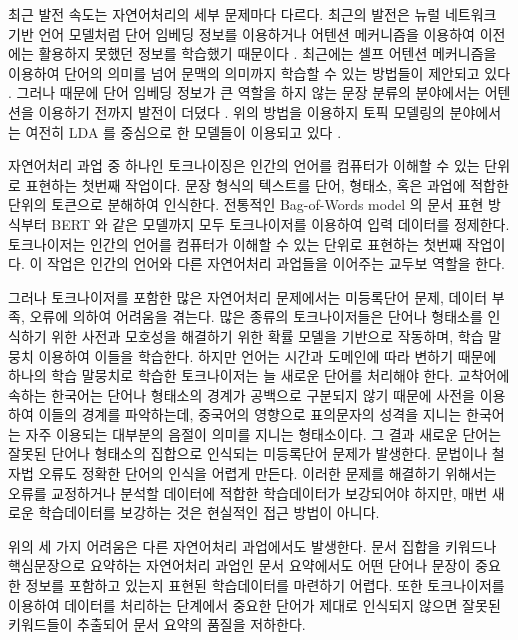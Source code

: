 \documentclass[oneside, ko,phd]{snuthesis_utf8_kor}
\begin{document}
최근 발전 속도는 자연어처리의 세부 문제마다 다르다.
최근의 발전은 뉴럴 네트워크 기반 언어 모델처럼 단어 임베딩 정보를 이용하거나 어텐션 메커니즘을 이용하여 이전에는 활용하지 못했던 정보를 학습했기 때문이다 \cite{joulin2016bag, bahdanau2014neural, lin2017structured}.
최근에는 셀프 어텐션 메커니즘을 이용하여 단어의 의미를 넘어 문맥의 의미까지 학습할 수 있는 방법들이 제안되고 있다 \cite{vaswani2017attention, devlin2018bert}.
그러나 때문에 단어 임베딩 정보가 큰 역할을 하지 않는 문장 분류의 분야에서는 어텐션을 이용하기 전까지 발전이 더뎠다 \cite{yang2016hierarchical}.
위의 방법을 이용하지 토픽 모델링의 분야에서는 여전히 LDA \cite{blei2003latent} 를 중심으로 한 모델들이 이용되고 있다 \cite{allahyari2017brief}.

자연어처리 과업 중 하나인 토크나이징은 인간의 언어를 컴퓨터가 이해할 수 있는 단위로 표현하는 첫번째 작업이다.
문장 형식의 텍스트를 단어, 형태소, 혹은 과업에 적합한 단위의 토큰으로 분해하여 인식한다.
전통적인 Bag-of-Words model 의 문서 표현 방식부터 BERT 와 같은 모델까지 모두 토크나이저를 이용하여 입력 데이터를 정제한다.
토크나이저는 인간의 언어를 컴퓨터가 이해할 수 있는 단위로 표현하는 첫번째 작업이다.
이 작업은 인간의 언어와 다른 자연어처리 과업들을 이어주는 교두보 역할을 한다.

그러나 토크나이저를 포함한 많은 자연어처리 문제에서는 미등록단어 문제, 데이터 부족, 오류에 의하여 어려움을 겪는다.
많은 종류의 토크나이저들은 단어나 형태소를 인식하기 위한 사전과 모호성을 해결하기 위한 확률 모델을 기반으로 작동하며, 학습 말뭉치 이용하여 이들을 학습한다.
하지만 언어는 시간과 도메인에 따라 변하기 때문에 하나의 학습 말뭉치로 학습한 토크나이저는 늘 새로운 단어를 처리해야 한다.
교착어에 속하는 한국어는 단어나 형태소의 경계가 공백으로 구분되지 않기 때문에 사전을 이용하여 이들의 경계를 파악하는데, 중국어의 영향으로 표의문자의 성격을 지니는 한국어는 자주 이용되는 대부분의 음절이 의미를 지니는 형태소이다.
그 결과 새로운 단어는 잘못된 단어나 형태소의 집합으로 인식되는 미등록단어 문제가 발생한다.
문법이나 철자법 오류도 정확한 단어의 인식을 어렵게 만든다.
이러한 문제를 해결하기 위해서는 오류를 교정하거나 분석할 데이터에 적합한 학습데이터가 보강되어야 하지만, 매번 새로운 학습데이터를 보강하는 것은 현실적인 접근 방법이 아니다.

위의 세 가지 어려움은 다른 자연어처리 과업에서도 발생한다.
문서 집합을 키워드나 핵심문장으로 요약하는 자연어처리 과업인 문서 요약에서도 어떤 단어나 문장이 중요한 정보를 포함하고 있는지 표현된 학습데이터를 마련하기 어렵다.
또한 토크나이저를 이용하여 데이터를 처리하는 단계에서 중요한 단어가 제대로 인식되지 않으면 잘못된 키워드들이 추출되어 문서 요약의 품질을 저하한다.
\end{document}
